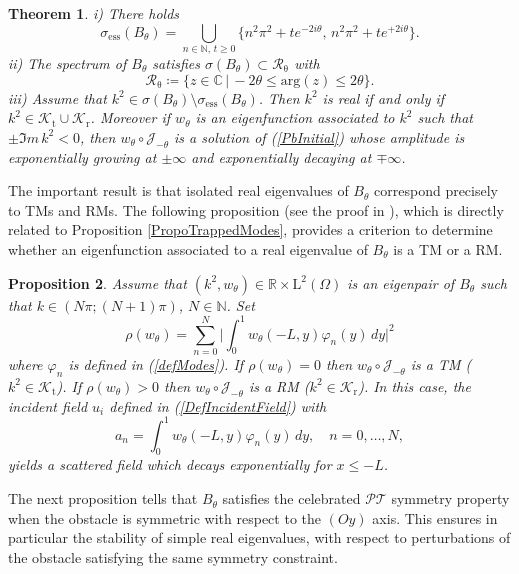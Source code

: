 \documentclass[11pt,a4paper]{report}
\newcommand{\Indicator}{\rho}
\newcommand{\Om}{\Omega}
\newcommand{\mrm}[1]{\mathrm{#1}}
\newcommand{\Cplx}{\mathbb{C}}
\newcommand{\N}{\mathbb{N}}
\newcommand{\R}{\mathbb{R}}
\newcommand{\mL}{\mrm{L}}
\newtheorem{theorem}{Theorem}[chapter]
\newtheorem{proposition}[theorem]{Proposition}
\begin{document}
\begin{theorem}\label{thmConjugatedPMLs} 
i) There holds 
\begin{equation}\label{essConjPMLs}
\sigma_{\mrm{ess}}(B_{\theta})=\bigcup_{n\in\N,\,t\ge0}\{n^2\pi^2+te^{-2i\theta},\,n^2\pi^2+te^{+2i\theta}\}.
\end{equation}
ii) The spectrum of $B_{\theta}$ satisfies $\sigma(B_{\theta})\subset\mathscr{R}_{\mrm{\theta}}$ with 
\begin{equation}\label{DefCPML}
\mathscr{R}_{\mrm{\theta}}\coloneqq\{z\in\Cplx\,|\,-2\theta\le\mrm{arg}(z)\le 2\theta\}.
\end{equation}
iii) Assume that $k^2\in\sigma(B_{\theta})\setminus\sigma_{\mrm{ess}}(B_{\theta})$. Then $k^2$ is real if and only if $k^2\in\mathscr{K}_{\mrm{t}}\cup\mathscr{K}_{\mrm{r}}$. Moreover if $w_{\theta}$ is an eigenfunction associated to $k^2$ such that $\pm\Im m\,k^2<0$, then $w_{\theta}\circ\mathcal{J}_{-\theta}$ is a solution of (\ref{PbInitial}) whose amplitude is exponentially growing at $\pm\infty$ and exponentially decaying at $\mp\infty$.
\end{theorem} 
\noindent The important result is that isolated real eigenvalues of $B_{\theta}$ correspond precisely to TMs and RMs. The following proposition (see the proof in \cite[Prop.\,4.2]{BoCP18}), which is directly related to Proposition \ref{PropoTrappedModes}, provides a criterion to determine whether an eigenfunction associated to a real eigenvalue of $B_{\theta}$ is a TM or a RM. 
\begin{proposition}\label{PropositionCarac}
Assume that $(k^2,w_{\theta})\in\R\times \mL^2(\Om)$ is an eigenpair of $B_{\theta}$ such that $k\in(N\pi;(N+1)\pi)$, $N\in\N$. Set
\begin{equation}\label{DefAlephFunction}
\Indicator(w_{\theta})=\sum_{n=0}^N\Big|\int_{0}^1w_{\theta}(-L,y)\varphi_n(y)\,dy\Big|^2
\end{equation}
where $\varphi_n$ is defined in (\ref{defModes}). If $\Indicator(w_{\theta})=0$ then $w_{\theta}\circ\mathcal{J}_{-\theta}$ is a TM ($k^2\in\mathscr{K}_{\mrm{t}}$). If $\Indicator(w_{\theta})>0$ then $w_{\theta}\circ\mathcal{J}_{-\theta}$ is a RM ($k^2\in\mathscr{K}_{\mrm{r}}$). In this case, the incident field $u_i$ defined in (\ref{DefIncidentField}) with
\[
a_n=\int_{0}^1w_{\theta}(-L,y)\varphi_n(y)\,dy,\quad n=0,\dots,N,
\]
yields a scattered field which decays exponentially for $x\le -L$.
\end{proposition}
\noindent The next proposition tells  that  $B_{\theta}$ satisfies the celebrated $\mathcal{PT}$ symmetry property when the obstacle is symmetric with respect to the $(Oy)$ axis. This ensures in particular the stability of simple real eigenvalues, with respect to perturbations of the obstacle satisfying the same symmetry constraint. 
\end{document}
